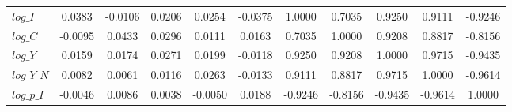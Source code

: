 \begin{center}
\begin{longtable}{lcccccccccc}
$log\_I          $	 & 	            0.0383	 & 	           -0.0106	 & 	            0.0206	 & 	            0.0254	 & 	           -0.0375	 & 	            1.0000	 & 	            0.7035	 & 	            0.9250	 & 	            0.9111	 & 	           -0.9246 \\ 
$log\_C          $	 & 	           -0.0095	 & 	            0.0433	 & 	            0.0296	 & 	            0.0111	 & 	            0.0163	 & 	            0.7035	 & 	            1.0000	 & 	            0.9208	 & 	            0.8817	 & 	           -0.8156 \\ 
$log\_Y          $	 & 	            0.0159	 & 	            0.0174	 & 	            0.0271	 & 	            0.0199	 & 	           -0.0118	 & 	            0.9250	 & 	            0.9208	 & 	            1.0000	 & 	            0.9715	 & 	           -0.9435 \\ 
$log\_Y\_N       $	 & 	            0.0082	 & 	            0.0061	 & 	            0.0116	 & 	            0.0263	 & 	           -0.0133	 & 	            0.9111	 & 	            0.8817	 & 	            0.9715	 & 	            1.0000	 & 	           -0.9614 \\ 
$log\_p\_I       $	 & 	           -0.0046	 & 	            0.0086	 & 	            0.0038	 & 	           -0.0050	 & 	            0.0188	 & 	           -0.9246	 & 	           -0.8156	 & 	           -0.9435	 & 	           -0.9614	 & 	            1.0000 \\ 
\end{longtable}
 \end{center}
